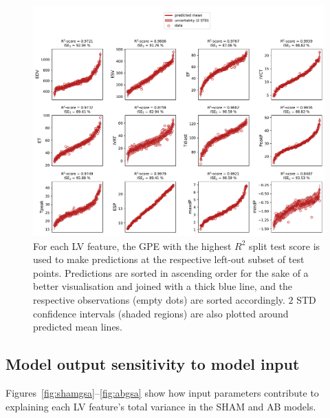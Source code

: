 \begin{figure}[ht!]
    \myfloatalign
    \includegraphics[width=\textwidth]{figures/chapter04/bgpes_vs_bsplit_ab.pdf}
    \caption{For each LV feature, the GPE with the highest $R^2$ split test score is used to make predictions at the respective left-out subset of test points. Predictions are sorted in ascending order for the sake of a better visualisation and joined with a thick blue line, and the respective observations (empty dots) are sorted accordingly. $2$ STD confidence intervals (shaded regions) are also plotted around predicted mean lines.}
    \label{fig:gpesexampleinferenceab}
\end{figure}


%
%
%
\subsection{Model output sensitivity to model input}
Figures~\ref{fig:shamgsa}--\ref{fig:abgsa} show how input parameters contribute to explaining each LV feature's total variance in the SHAM and AB models.

